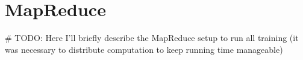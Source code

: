 
\section{MapReduce}
\# TODO: Here I'll briefly describe the MapReduce setup to run all training (it was necessary to distribute computation to keep running time manageable)

